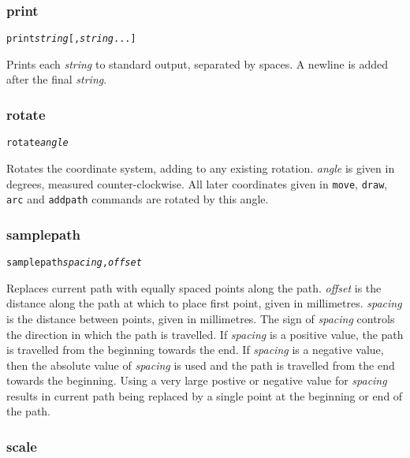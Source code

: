 \subsubsection{print}

\begin{alltt}
print \textit{string} [, \textit{string} ...]
\end{alltt}

Prints each \textit{string} to standard output,
separated by spaces.
A newline is added after the final \textit{string}.

\subsubsection{rotate}

\begin{alltt}
rotate \textit{angle}
\end{alltt}

Rotates the coordinate system, adding to any existing rotation.  \textit{angle}
is given in degrees, measured counter-clockwise.  All later coordinates given
in \texttt{move}, \texttt{draw}, \texttt{arc} and \texttt{addpath} commands are
rotated by this angle.

\subsubsection{samplepath}

\begin{alltt}
samplepath \textit{spacing}, \textit{offset}
\end{alltt}

Replaces current path with equally spaced points along the path.
\textit{offset} is the distance along the path at which to place first point,
given in millimetres.  \textit{spacing} is the distance between points, given
in millimetres.  The sign of \textit{spacing} controls the direction in which
the path is travelled.  If \textit{spacing} is a positive value, the path is
travelled from the beginning towards the end.  If \textit{spacing} is a
negative value, then the absolute value of \textit{spacing} is used and the
path is travelled from the end towards the beginning.  Using a very large
postive or negative value for \textit{spacing} results in current path being
replaced by a single point at the beginning or end of the path.

\subsubsection{scale}

